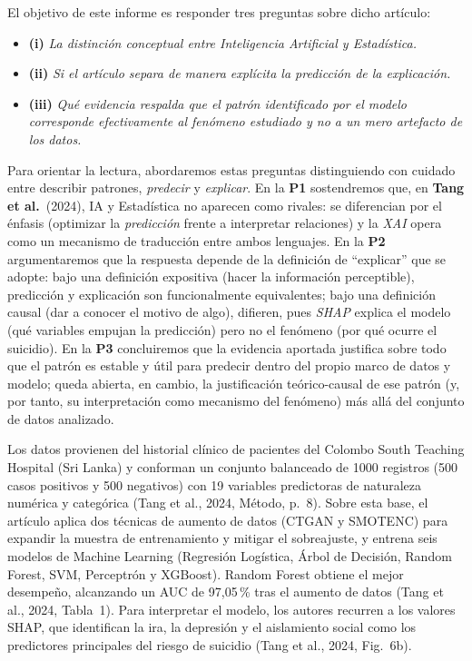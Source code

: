 \documentclass[11pt]{article}
\begin{document}
El objetivo de este informe es responder tres preguntas sobre dicho artículo:
\begin{itemize}
  \item \textbf{(i)} \textit{La distinción conceptual entre Inteligencia Artificial y Estadística.}
  \item \textbf{(ii)} \textit{Si el artículo separa de manera explícita la predicción de la explicación.}
  \item \textbf{(iii)} \textit{Qué evidencia respalda que el patrón identificado por el modelo corresponde efectivamente al fenómeno estudiado y no a un mero artefacto de los datos.}
\end{itemize}

Para orientar la lectura, abordaremos estas preguntas distinguiendo con cuidado entre describir patrones, \textit{predecir} y \textit{explicar}. En la \textbf{P1} sostendremos que, en \textbf{Tang et al.}\ (2024), IA y Estadística no aparecen como rivales: se diferencian por el énfasis (optimizar la \textit{predicción} frente a interpretar relaciones) y la \textit{XAI} opera como un mecanismo de traducción entre ambos lenguajes. En la \textbf{P2} argumentaremos que la respuesta depende de la definición de ``explicar'' que se adopte: bajo una definición expositiva (hacer la información perceptible), predicción y explicación son funcionalmente equivalentes; bajo una definición causal (dar a conocer el motivo de algo), difieren, pues \textit{SHAP} explica el modelo (qué variables empujan la predicción) pero no el fenómeno (por qué ocurre el suicidio). En la \textbf{P3} concluiremos que la evidencia aportada justifica sobre todo que el patrón es estable y útil para predecir dentro del propio marco de datos y modelo; queda abierta, en cambio, la justificación teórico-causal de ese patrón (y, por tanto, su interpretación como mecanismo del fenómeno) más allá del conjunto de datos analizado.

Los datos provienen del historial clínico de pacientes del Colombo South Teaching Hospital (Sri Lanka) y conforman un conjunto balanceado de 1000 registros (500 casos positivos y 500 negativos) con 19 variables predictoras de naturaleza numérica y categórica (Tang et al., 2024, Método, p.~8). Sobre esta base, el artículo aplica dos técnicas de aumento de datos (CTGAN y SMOTENC) para expandir la muestra de entrenamiento y mitigar el sobreajuste, y entrena seis modelos de Machine Learning (Regresión Logística, Árbol de Decisión, Random Forest, SVM, Perceptrón y XGBoost). Random Forest obtiene el mejor desempeño, alcanzando un AUC de 97{,}05\,\% tras el aumento de datos (Tang et al., 2024, Tabla~1). Para interpretar el modelo, los autores recurren a los valores SHAP, que identifican la ira, la depresión y el aislamiento social como los predictores principales del riesgo de suicidio (Tang et al., 2024, Fig.~6b).
\end{document}
